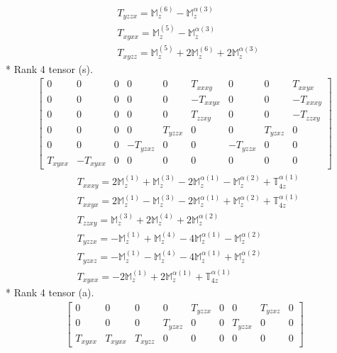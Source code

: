 \documentclass[fleqn,8pt,landscape]{jsarticle}
\begin{document}
\begin{align*}
& T_{yzzx} = \mathbb{M}_{z}^{(6)} - \mathbb{M}_{z}^{\alpha(3)} \\
& T_{xyxx} = \mathbb{M}_{z}^{(5)} - \mathbb{M}_{z}^{\alpha(3)} \\
& T_{xyzz} = \mathbb{M}_{z}^{(5)} + 2 \mathbb{M}_{z}^{(6)} + 2 \mathbb{M}_{z}^{\alpha(3)}
\end{align*}
* Rank 4 tensor (s).
\begin{align*}
\begin{bmatrix} 0 & 0 & 0 & 0 & 0 & T_{xxxy} & 0 & 0 & T_{xxyx} \\ 0 & 0 & 0 & 0 & 0 & - T_{xxyx} & 0 & 0 & - T_{xxxy} \\ 0 & 0 & 0 & 0 & 0 & T_{zzxy} & 0 & 0 & - T_{zzxy} \\ 0 & 0 & 0 & 0 & T_{yzzx} & 0 & 0 & T_{yzxz} & 0 \\ 0 & 0 & 0 & - T_{yzxz} & 0 & 0 & - T_{yzzx} & 0 & 0 \\ T_{xyxx} & - T_{xyxx} & 0 & 0 & 0 & 0 & 0 & 0 & 0 \end{bmatrix}
\end{align*}
\begin{align*}
& T_{xxxy} = 2 \mathbb{M}_{z}^{(1)} + \mathbb{M}_{z}^{(3)} - 2 \mathbb{M}_{z}^{\alpha(1)} - \mathbb{M}_{z}^{\alpha(2)} + \mathbb{T}_{4z}^{\alpha(1)} \\
& T_{xxyx} = 2 \mathbb{M}_{z}^{(1)} - \mathbb{M}_{z}^{(3)} - 2 \mathbb{M}_{z}^{\alpha(1)} + \mathbb{M}_{z}^{\alpha(2)} + \mathbb{T}_{4z}^{\alpha(1)} \\
& T_{zzxy} = \mathbb{M}_{z}^{(3)} + 2 \mathbb{M}_{z}^{(4)} + 2 \mathbb{M}_{z}^{\alpha(2)} \\
& T_{yzzx} = - \mathbb{M}_{z}^{(1)} + \mathbb{M}_{z}^{(4)} - 4 \mathbb{M}_{z}^{\alpha(1)} - \mathbb{M}_{z}^{\alpha(2)} \\
& T_{yzxz} = - \mathbb{M}_{z}^{(1)} - \mathbb{M}_{z}^{(4)} - 4 \mathbb{M}_{z}^{\alpha(1)} + \mathbb{M}_{z}^{\alpha(2)} \\
& T_{xyxx} = - 2 \mathbb{M}_{z}^{(1)} + 2 \mathbb{M}_{z}^{\alpha(1)} + \mathbb{T}_{4z}^{\alpha(1)}
\end{align*}
* Rank 4 tensor (a).
\begin{align*}
\begin{bmatrix} 0 & 0 & 0 & 0 & T_{yzzx} & 0 & 0 & T_{yzxz} & 0 \\ 0 & 0 & 0 & T_{yzxz} & 0 & 0 & T_{yzzx} & 0 & 0 \\ T_{xyxx} & T_{xyxx} & T_{xyzz} & 0 & 0 & 0 & 0 & 0 & 0 \end{bmatrix}
\end{align*}
\end{document}
